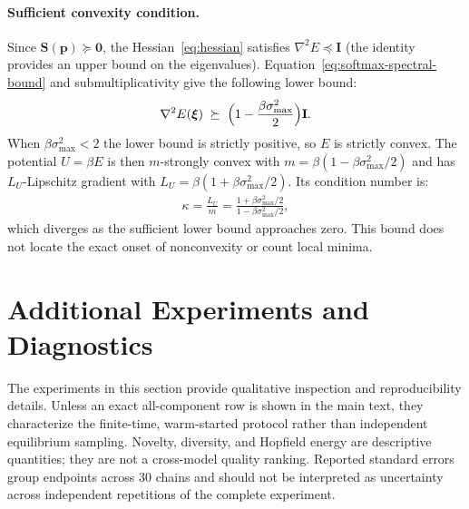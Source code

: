 \paragraph{Sufficient convexity condition.}
Since $\mathbf{S}(\mathbf{p})\succeq\mathbf{0}$, the Hessian~\eqref{eq:hessian} satisfies $\nabla^{2}E\preceq\mathbf{I}$ (the identity provides an upper bound on the eigenvalues). Equation~\eqref{eq:softmax-spectral-bound} and submultiplicativity give the following lower bound:
\begin{align*}
\nabla^{2}E(\boldsymbol{\xi})
\;\succeq\; \Bigl(1-\frac{\beta\sigma_{\max}^{2}}{2}\Bigr)\mathbf{I}.
\end{align*}
When $\beta\sigma_{\max}^{2}<2$ the lower bound is strictly positive, so $E$ is strictly convex. The potential $U=\beta E$ is then $m$-strongly convex with $m=\beta(1-\beta\sigma_{\max}^{2}/2)$ and has $L_{U}$-Lipschitz gradient with $L_{U}=\beta(1+\beta\sigma_{\max}^{2}/2)$. Its condition number is:
\begin{align*}
\kappa = \frac{L_{U}}{m}
= \frac{1+\beta\sigma_{\max}^{2}/2}{1-\beta\sigma_{\max}^{2}/2},
\end{align*}
which diverges as the sufficient lower bound approaches zero. This bound does
not locate the exact onset of nonconvexity or count local minima.




\section{Additional Experiments and Diagnostics}
\label{app:additional-experiments}

The experiments in this section provide qualitative inspection and
reproducibility details. Unless an
exact all-component row is shown in the main text, they characterize the
finite-time, warm-started protocol rather than independent equilibrium
sampling. Novelty, diversity, and Hopfield energy are descriptive quantities;
they are not a cross-model quality ranking. Reported standard errors group
endpoints across 30 chains and should not be interpreted as uncertainty across
independent repetitions of the complete experiment.


